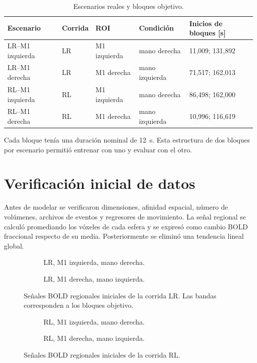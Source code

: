 \begin{table}[H]
\centering
\caption{Escenarios reales y bloques objetivo.}
\label{tab:real_scenarios}
\begin{tabularx}{\textwidth}{l l l l X}
\toprule
\textbf{Escenario} & \textbf{Corrida} & \textbf{ROI} & \textbf{Condición} & \textbf{Inicios de bloques [s]} \\
\midrule
LR--M1 izquierda & LR & M1 izquierda & mano derecha & 11,009; 131,892 \\
LR--M1 derecha & LR & M1 derecha & mano izquierda & 71,517; 162,013 \\
RL--M1 izquierda & RL & M1 izquierda & mano derecha & 86,498; 162,000 \\
RL--M1 derecha & RL & M1 derecha & mano izquierda & 10,996; 116,619 \\
\bottomrule
\end{tabularx}
\end{table}

Cada bloque tenía una duración nominal de \SI{12}{s}. Esta estructura de dos bloques por escenario permitió entrenar con uno y evaluar con el otro.

\section{Verificación inicial de datos}
Antes de modelar se verificaron dimensiones, afinidad espacial, número de volúmenes, archivos de eventos y regresores de movimiento. La señal regional se calculó promediando los vóxeles de cada esfera y se expresó como cambio BOLD fraccional respecto de su media. Posteriormente se eliminó una tendencia lineal global.

\begin{figure}[H]
\centering
\begin{subfigure}[t]{0.49\textwidth}
\caption{LR, M1 izquierda, mano derecha.}
\end{subfigure}\hfill
\begin{subfigure}[t]{0.49\textwidth}
\caption{LR, M1 derecha, mano izquierda.}
\end{subfigure}
\caption{Señales BOLD regionales iniciales de la corrida LR. Las bandas corresponden a los bloques objetivo.}
\label{fig:raw_lr}
\end{figure}

\begin{figure}[H]
\centering
\begin{subfigure}[t]{0.49\textwidth}
\caption{RL, M1 izquierda, mano derecha.}
\end{subfigure}\hfill
\begin{subfigure}[t]{0.49\textwidth}
\caption{RL, M1 derecha, mano izquierda.}
\end{subfigure}
\caption{Señales BOLD regionales iniciales de la corrida RL.}
\label{fig:raw_rl}
\end{figure}

